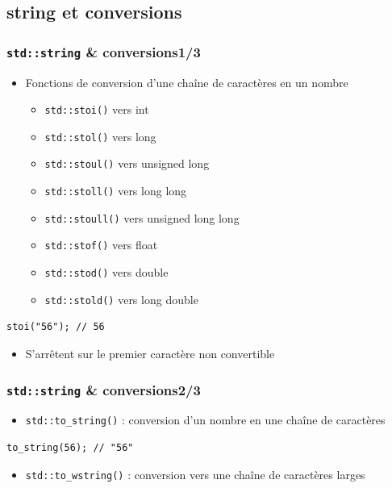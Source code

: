 \documentclass[C++.tex]{subfiles}
\begin{document}
\subsection*{string et conversions}
\begin{frame}[fragile]
	\frametitle{\lstinline|std::string| \& conversions\titlehfill{}1/3}
	\begin{itemize}
		\item Fonctions de conversion d'une chaîne de caractères en un nombre
		\begin{itemize}
			\item \lstinline|std::stoi()| vers int
			\item \lstinline|std::stol()| vers long
			\item \lstinline|std::stoul()| vers unsigned long
			\item \lstinline|std::stoll()| vers long long
			\item \lstinline|std::stoull()| vers unsigned long long
			\item \lstinline|std::stof()| vers float
			\item \lstinline|std::stod()| vers double
			\item \lstinline|std::stold()| vers long double
		\end{itemize}
	\end{itemize}

	\begin{lstlisting}
stoi("56"); // 56\end{lstlisting}

	\begin{itemize}
		\item S'arrêtent sur le premier caractère non convertible
	\end{itemize}
\end{frame}

\begin{frame}[fragile]
	\frametitle{\lstinline|std::string| \& conversions\titlehfill{}2/3}
	\begin{itemize}
		\item \lstinline|std::to_string()| : conversion d'un nombre en une chaîne de caractères
	\end{itemize}

	\begin{lstlisting}
to_string(56); // "56"\end{lstlisting}

	\begin{itemize}
		\item \lstinline|std::to_wstring()| : conversion vers une chaîne de caractères larges
	\end{itemize}
\end{frame}
\end{document}
